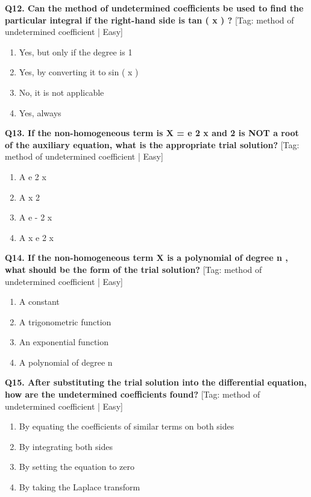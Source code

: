 \noindent\textbf{Q12. Can the method of undetermined coefficients be used to find the particular integral if the right-hand side is tan ( x ) ?} \hfill [Tag: method of undetermined coefficient | Easy]
\begin{enumerate}[label=(\alph*),topsep=2pt,itemsep=1pt,partopsep=0pt,parsep=0pt]
    \item {{Yes, but only if the degree is 1}}
    \item {{Yes, by converting it to sin ( x )}}
    \item {{No, it is not applicable}}
    \item {{Yes, always}}
\end{enumerate}
\vspace{2mm}

\noindent\textbf{Q13. If the non-homogeneous term is X = e 2 x and 2 is NOT a root of the auxiliary equation, what is the appropriate trial solution?} \hfill [Tag: method of undetermined coefficient | Easy]
\begin{enumerate}[label=(\alph*),topsep=2pt,itemsep=1pt,partopsep=0pt,parsep=0pt]
    \item {{A e 2 x}}
    \item {{A x 2}}
    \item {{A e - 2 x}}
    \item {{A x e 2 x}}
\end{enumerate}
\vspace{2mm}

\noindent\textbf{Q14. If the non-homogeneous term X is a polynomial of degree n , what should be the form of the trial solution?} \hfill [Tag: method of undetermined coefficient | Easy]
\begin{enumerate}[label=(\alph*),topsep=2pt,itemsep=1pt,partopsep=0pt,parsep=0pt]
    \item {{A constant}}
    \item {{A trigonometric function}}
    \item {{An exponential function}}
    \item {{A polynomial of degree n}}
\end{enumerate}
\vspace{2mm}

\noindent\textbf{Q15. After substituting the trial solution into the differential equation, how are the undetermined coefficients found?} \hfill [Tag: method of undetermined coefficient | Easy]
\begin{enumerate}[label=(\alph*),topsep=2pt,itemsep=1pt,partopsep=0pt,parsep=0pt]
    \item {{By equating the coefficients of similar terms on both sides}}
    \item {{By integrating both sides}}
    \item {{By setting the equation to zero}}
    \item {{By taking the Laplace transform}}
\end{enumerate}
\vspace{2mm}

